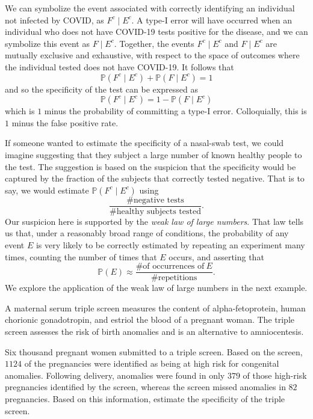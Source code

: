 \documentclass[../book.tex]{subfiles}
\begin{document}
\begin{solution}
We can symbolize the event associated with correctly identifying an individual not infected by COVID, as \(F^c  \mid  E^c\).
A type-I error will have occurred when an individual who does not have COVID-19 tests positive for the disease, and we can symbolize this event as \(F  \mid  E^c\). Together, the events \(F^c \mid  E^c\) and \(F  \mid  E^c\) are mutually exclusive and exhaustive, with respect to the space of outcomes where the individual tested does not have COVID-19. It follows that
\begin{equation}\label{eq:prob-6}
\mathbb{P}(F^c  \mid  E^c) + \mathbb{P}(F  \mid  E^c) = 1
\end{equation}
and so the specificity of the test can be expressed as
\begin{equation}\label{eq:prob-7}
\mathbb{P}(F^c  \mid  E^c) = 1 - \mathbb{P}(F  \mid  E^c)
\end{equation}
which is \(1\) minus the probability of committing a type-I error. Colloquially, this is \(1\) minus the false positive rate.
\end{solution}

If someone wanted to estimate the specificity of a nasal-swab test, we could imagine suggesting that they subject a large number of known healthy people to the test. The suggestion is based on the suspicion that the specificity would be captured by the fraction of the subjects that correctly tested negative. That is to say, we would estimate \(\mathbb{P}(F^c  \mid  E^c)\) using
\begin{equation}\label{eq:prob-8}
\frac{\text{\# negative tests}}{\text{\# healthy subjects tested}}.
\end{equation}
Our suspicion here is supported by the \emph{weak law of large numbers}. That law tells us that, under a reasonably broad range of conditions, the probability of any event \(E\) is very likely to be correctly estimated by repeating an experiment many times, counting the number of times that \(E\) occurs, and asserting that
\begin{equation}\label{eq:prob-9}
\mathbb{P}(E) \approx \frac{\text{\# of occurrences of} \ E}{\text{\# repetitions}}.
\end{equation}
We explore the application of the weak law of large numbers in the next example.

\begin{example} \label{eg:triple}
A maternal serum triple screen measures the content of alpha-fetoprotein, human chorionic gonadotropin, and estriol the blood of a pregnant woman. The triple screen assesses the risk of birth anomalies and is an alternative to amniocentesis.

Six thousand pregnant women submitted to a triple screen. Based on the screen, \(1 124\) of the pregnancies were identified as being at high risk for congenital anomalies. Following delivery, anomalies were found in only \(379\) of those high-risk pregnancies identified by the screen, whereas the screen missed anomalies in \(82\) pregnancies. Based on this information, estimate the specificity of the triple screen.
\end{example}
\end{document}
